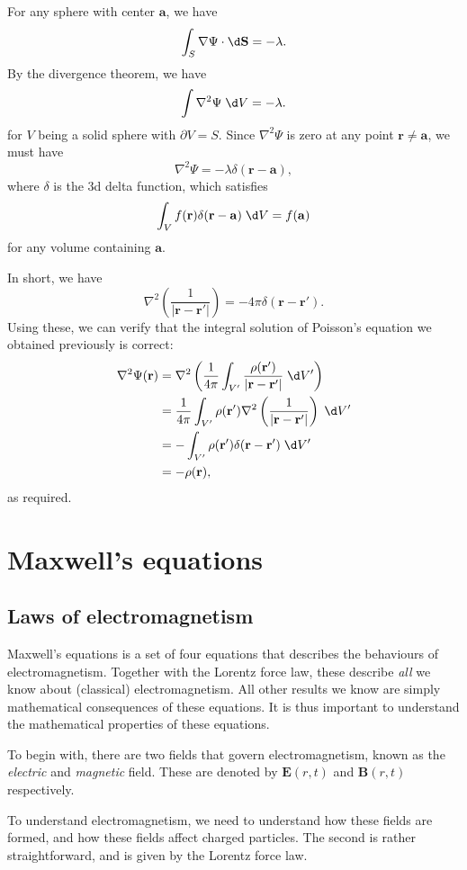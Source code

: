 \documentclass[a4paper]{article}
\begin{document}
For any sphere with center $\mathbf{a}$, we have
\[
  \int_S \nabla \Psi\cdot \d \mathbf{S} = -\lambda.
\]
By the divergence theorem, we have
\[
  \int \nabla^2\Psi \;\d V = -\lambda.
\]
for $V$ being a solid sphere with $\partial V = S$. Since $\nabla^2\Psi$ is zero at any point $\mathbf{r} \not = \mathbf{a}$, we must have
\[
  \nabla^2\Psi = -\lambda \delta(\mathbf{r} - \mathbf{a}),
\]
where $\delta$ is the 3d delta function, which satisfies
\[
  \int_V f(\mathbf{r}) \delta (\mathbf{r} - \mathbf{a})\;\d V = f(\mathbf{a})
\]
for any volume containing $\mathbf{a}$.

In short, we have
\[
  \nabla^2\left(\frac{1}{|\mathbf{r} - \mathbf{r}'|}\right) = -4\pi\delta(\mathbf{r} - \mathbf{r}').
\]
Using these, we can verify that the integral solution of Poisson's equation we obtained previously is correct:
\begin{align*}
  \nabla^2 \Psi(\mathbf{r}) &= \nabla^2\left(\frac{1}{4\pi}\int_{V'}\frac{\rho(\mathbf{r}')}{|\mathbf{r} - \mathbf{r}'|}\;\d V'\right)\\
  &= \frac{1}{4\pi}\int_{V'} \rho(\mathbf{r}')\nabla^2\left(\frac{1}{|\mathbf{r} - \mathbf{r}'|}\right)\;\d V'\\
  &= -\int_{V'} \rho(\mathbf{r}') \delta(\mathbf{r} - \mathbf{r}')\;\d V'\\
  &= -\rho (\mathbf{r}),
\end{align*}
as required.
\section{Maxwell's equations}
\subsection{Laws of electromagnetism}
Maxwell's equations is a set of four equations that describes the behaviours of electromagnetism. Together with the Lorentz force law, these describe \emph{all} we know about (classical) electromagnetism. All other results we know are simply mathematical consequences of these equations. It is thus important to understand the mathematical properties of these equations.

To begin with, there are two fields that govern electromagnetism, known as the \emph{electric} and \emph{magnetic} field. These are denoted by $\mathbf{E}(r, t)$ and $\mathbf{B}(r, t)$ respectively.

To understand electromagnetism, we need to understand how these fields are formed, and how these fields affect charged particles. The second is rather straightforward, and is given by the Lorentz force law.
\end{document}
